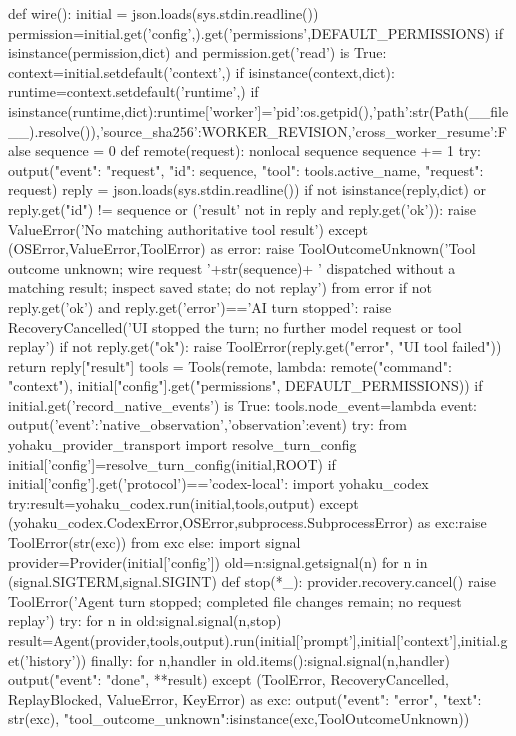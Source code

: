 def wire():
    initial = json.loads(sys.stdin.readline())
    permission=initial.get('config',{}).get('permissions',DEFAULT_PERMISSIONS)
    if isinstance(permission,dict) and permission.get('read') is True:
        context=initial.setdefault('context',{})
        if isinstance(context,dict):
            runtime=context.setdefault('runtime',{})
            if isinstance(runtime,dict):runtime['worker']={'pid':os.getpid(),'path':str(Path(__file__).resolve()),'source_sha256':WORKER_REVISION,'cross_worker_resume':False}
    sequence = 0
    def remote(request):
        nonlocal sequence
        sequence += 1
        try:
            output({"event": "request", "id": sequence, "tool": tools.active_name, "request": request})
            reply = json.loads(sys.stdin.readline())
            if not isinstance(reply,dict) or reply.get("id") != sequence or ('result' not in reply and reply.get('ok')):
                raise ValueError('No matching authoritative tool result')
        except (OSError,ValueError,ToolError) as error:
            raise ToolOutcomeUnknown('Tool outcome unknown; wire request '+str(sequence)+
                ' dispatched without a matching result; inspect saved state; do not replay') from error
        if not reply.get('ok') and reply.get('error')=='AI turn stopped':
            raise RecoveryCancelled('UI stopped the turn; no further model request or tool replay')
        if not reply.get("ok"):
            raise ToolError(reply.get("error", "UI tool failed"))
        return reply["result"]
    tools = Tools(remote, lambda: remote({"command": "context"}), initial["config"].get("permissions", DEFAULT_PERMISSIONS))
    if initial.get('record_native_events') is True:
        tools.node_event=lambda event: output({'event':'native_observation','observation':event})
    try:
        from yohaku_provider_transport import resolve_turn_config
        initial['config']=resolve_turn_config(initial,ROOT)
        if initial['config'].get('protocol')=='codex-local':
            import yohaku_codex
            try:result=yohaku_codex.run(initial,tools,output)
            except (yohaku_codex.CodexError,OSError,subprocess.SubprocessError) as exc:raise ToolError(str(exc)) from exc
        else:
            import signal
            provider=Provider(initial['config'])
            old={n:signal.getsignal(n) for n in (signal.SIGTERM,signal.SIGINT)}
            def stop(*_):
                provider.recovery.cancel()
                raise ToolError('Agent turn stopped; completed file changes remain; no request replay')
            try:
                for n in old:signal.signal(n,stop)
                result=Agent(provider,tools,output).run(initial['prompt'],initial['context'],initial.get('history'))
            finally:
                for n,handler in old.items():signal.signal(n,handler)
        output({"event": "done", **result})
    except (ToolError, RecoveryCancelled, ReplayBlocked, ValueError, KeyError) as exc:
        output({"event": "error", "text": str(exc), "tool_outcome_unknown":isinstance(exc,ToolOutcomeUnknown)})


